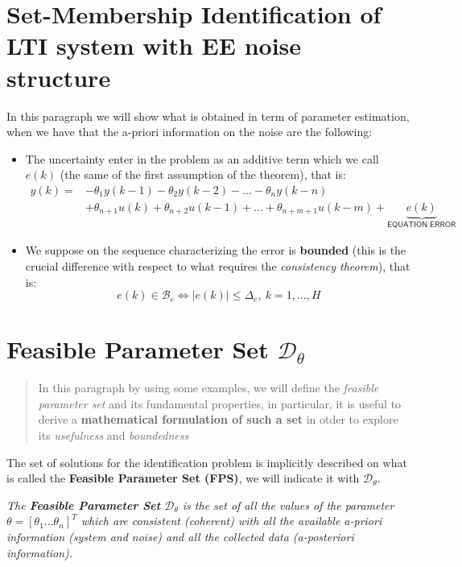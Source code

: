 \section{Set-Membership Identification of LTI system with EE noise structure}
In this paragraph we will show what is obtained in term of parameter estimation, when we have that the a-priori information on the noise are the following:
\begin{itemize}
    \item[\ding{51}] The uncertainty enter in the problem as an additive term which we call $e(k)$ (the same of the first assumption of the theorem), that is:
    \begin{align*}
        y(k) = &-\theta_1{y(k-1)}-\theta_2{y(k-2)}-...-\theta_n{y(k-n)}\\
        &+\theta_{n+1}u(k)+\theta_{n+2}u(k-1)+...+\theta_{n+m+1}u(k-m) + \underbrace{e(k)}_{\textsf{EQUATION ERROR}}
    \end{align*}
    \item[\ding{51}] We suppose on the sequence characterizing the error is \textbf{bounded} (this is the crucial difference with respect to what requires the \textit{consistency theorem}), that is:
    \begin{equation}\label{eq:boundedness}
        e(k)\in\mathcal{B}_e \iff \vert e(k) \vert \le \Delta_e, \ k=1, ..., H
    \end{equation}
\end{itemize}
\section{Feasible Parameter Set $\mathcal{D}_\theta$}

\begin{quotation}
    \noindent
    \textsf{In this paragraph by using some examples, we will define the \textit{feasible parameter set} and its fundamental properties, in particular, it is useful to derive a \textbf{mathematical formulation of such a set} in otder to explore its \textit{usefulness} and \textit{boundedness}}
\end{quotation}

\noindent
The set of solutions for the identification problem is implicitly described on what is called the \textbf{Feasible Parameter Set (FPS)}, we will indicate it with $\mathcal{D}_\theta$.

\begin{definition} \textit{The \textbf{Feasible Parameter Set} $\mathcal{D}_\theta$ is the set of all the values of the parameter $\theta=[\theta_1 ... \theta_n]^T$ which are consistent (coherent) with all the available a-priori information (system and noise) and all the collected data (a-posteriori information).}
\end{definition}


